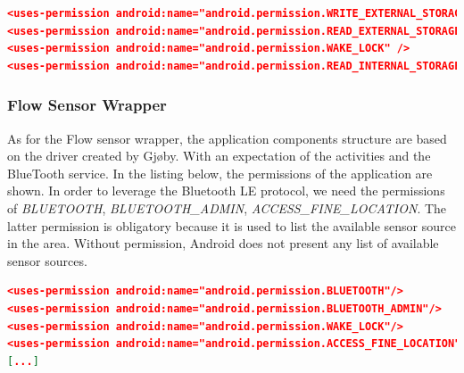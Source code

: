 \begin{lstlisting}[language=json, caption={}, captionpos=b]
<uses-permission android:name="android.permission.WRITE_EXTERNAL_STORAGE" />
<uses-permission android:name="android.permission.READ_EXTERNAL_STORAGE" />
<uses-permission android:name="android.permission.WAKE_LOCK" />
<uses-permission android:name="android.permission.READ_INTERNAL_STORAGE" />
\end{lstlisting}

\subsubsection{Flow Sensor Wrapper}

As for the Flow sensor wrapper, the application components structure are based on the driver created by Gjøby. With an expectation of the activities and the BlueTooth service. In the listing below, the permissions of the application are shown. In order to leverage the Bluetooth LE protocol, we need the permissions of \textit{BLUETOOTH}, \textit{BLUETOOTH\_ADMIN}, \textit{ACCESS\_FINE\_LOCATION}. The latter permission is obligatory because it is used to list the available sensor source in the area. Without permission, Android does not present any list of available sensor sources. 

\begin{lstlisting}[language=json, caption={}, captionpos=b]
<uses-permission android:name="android.permission.BLUETOOTH"/>
<uses-permission android:name="android.permission.BLUETOOTH_ADMIN"/>
<uses-permission android:name="android.permission.WAKE_LOCK"/>
<uses-permission android:name="android.permission.ACCESS_FINE_LOCATION"/>
[...]
\end{lstlisting}


